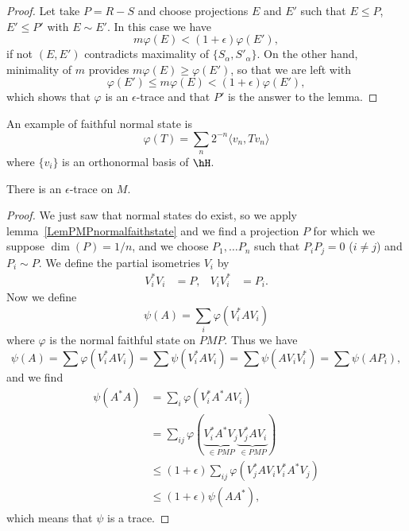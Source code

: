 \begin{proof}
	Let take $P=R-S$ and choose projections $E$ and $E'$ such that $E\leq P$, $E'\leq P'$ with $E\sim E'$. In this case we have
	\[
		m\varphi(E)<(1+\epsilon)\varphi(E'),
	\]
	if not $(E,E')$ contradicts maximality of $\{ S_{\alpha},S'_{\alpha} \}$. On the other hand, minimality of $m$ provides $m\varphi(E)\geq \varphi(E')$, so that we are left with
	\begin{equation}
		\varphi(E')\leq m\varphi(E)<(1+\epsilon)\varphi(E'),
	\end{equation}
	which shows that $\varphi$ is an $\epsilon$-trace and that $P'$ is the answer to the lemma.

\end{proof}

An example of faithful normal state is
\begin{equation}
	\varphi(T)=\sum_n2^{-n}\langle v_n, Tv_n\rangle
\end{equation}
where $\{ v_i \}$ is an orthonormal basis of $\hH$.

\begin{proposition}
	There is an $\epsilon$-trace on $M$.
\end{proposition}

\begin{proof}
	We just saw that normal states do exist, so we apply lemma~\ref{LemPMPnormalfaithstate} and we find a projection $P$ for which we suppose $\dim(P)=1/n$, and we choose $P_1,\ldots P_n$ such that $P_iP_j=0$ ($i\neq j$) and $P_i\sim P$. We define the partial isometries $V_i$ by
	\begin{align*}
		V_i^*V_i & =P, & V_iV_i^* & =P_i.
	\end{align*}
	Now we define
	\[
		\psi(A)=\sum_i\varphi(V_i^*AV_i)
	\]
	where $\varphi$ is the normal faithful state on $PMP$. Thus we have
	\[
		\psi(A)=\sum\varphi(V_i^*AV_i)=\sum\psi(V_i^*AV_i)=\sum\psi(AV_iV_i^*)=\sum\psi(AP_i),
	\]
	and we find
	\begin{equation}
		\begin{split}
			\psi(A^*A)	&=\sum_i\varphi(V_i^*A^*AV_i)\\
			&=\sum_{ij}\varphi(\underbrace{V_i^*A^*V_j}_{\in PMP}\underbrace{V_j^*AV_i}_{\in PMP})\\
			&\leq(1+\epsilon)\sum_{ij}\varphi(V_j^*AV_iV_i^*A^*V_j)\\
			&\leq (1+\epsilon)\psi(AA^*),
		\end{split}
	\end{equation}
	which means that $\psi$ is a trace.
\end{proof}

